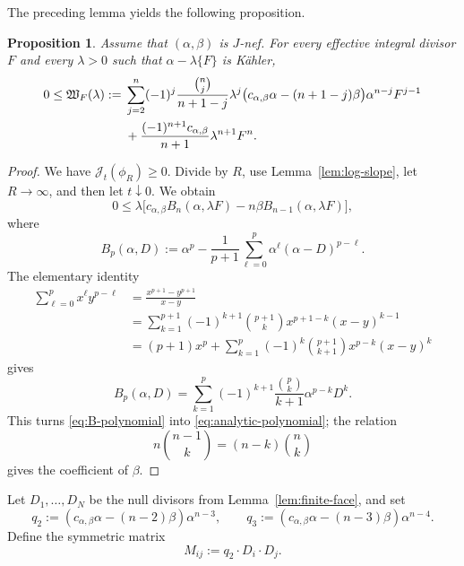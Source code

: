 \documentclass[reqno]{amsart}
\newcommand{\cab}{c_{\alpha,\beta}}
\theoremstyle{plain}
\newtheorem{proposition}[thm]{Proposition}
\theoremstyle{remark}
\begin{document}
The preceding lemma yields the following proposition.
\begin{proposition}
\label{prop:analytic-polynomial}
Assume that $(\alpha,\beta)$ is $J$-nef. For every effective integral
divisor $F$ and every $\lambda>0$ such that
$\alpha-\lambda\{F\}$ is K\"ahler,
\begin{align}
0\leq\mathfrak W_F(\lambda)
:={}&
\sum_{j=2}^{n}(-1)^j
\frac{\binom nj}{n+1-j}\lambda^j
\bigl(\cab\alpha-(n+1-j)\beta\bigr)
\alpha^{n-j}F^{j-1}\notag\\
&+
\frac{(-1)^{n+1}\cab}{n+1}\lambda^{n+1}F^n.
\label{eq:analytic-polynomial}
\end{align}
\end{proposition}
\begin{proof}
We have $\mathcal J_t(\phi_R)\geq0$. Divide by $R$, use
Lemma~\ref{lem:log-slope}, let $R\to\infty$, and then let
$t\downarrow0$. We obtain
\begin{equation}\label{eq:B-polynomial}
 0\leq
 \lambda\bigl[\cab B_n(\alpha,\lambda F)
             -n\beta B_{n-1}(\alpha,\lambda F)\bigr],
\end{equation}
where
\[
 B_p(\alpha,D)
 :=
 \alpha^p-\frac1{p+1}
 \sum_{\ell=0}^p\alpha^\ell(\alpha-D)^{p-\ell}.
\]
The elementary identity
\[
\begin{aligned}
 \sum_{\ell=0}^p x^\ell y^{p-\ell}
 &=\frac{x^{p+1}-y^{p+1}}{x-y}\\
 &=\sum_{k=1}^{p+1}(-1)^{k+1}\binom{p+1}{k}
   x^{p+1-k}(x-y)^{k-1}\\
 &=(p+1)x^p+
   \sum_{k=1}^{p}(-1)^k\binom{p+1}{k+1}x^{p-k}(x-y)^k
\end{aligned}
\]
gives
\[
 B_p(\alpha,D)
 =\sum_{k=1}^p(-1)^{k+1}
 \frac{\binom pk}{k+1}\alpha^{p-k}D^k.
\]
This turns \eqref{eq:B-polynomial} into
\eqref{eq:analytic-polynomial}; the relation
\[
 n\binom{n-1}{k}=(n-k)\binom nk
\]
gives the coefficient of $\beta$.
\end{proof}

Let $D_1,\ldots,D_N$ be the null divisors from
Lemma~\ref{lem:finite-face}, and set
\begin{equation}\label{eq:q-r}
 q_2:=(\cab\alpha-(n-2)\beta)\alpha^{n-3},
 \qquad
 q_3:=(\cab\alpha-(n-3)\beta)\alpha^{n-4}.
\end{equation}
Define the symmetric matrix
\begin{equation}\label{eq:M}
 M_{ij}:=q_2\cdot D_i\cdot D_j.
\end{equation}
\end{document}
